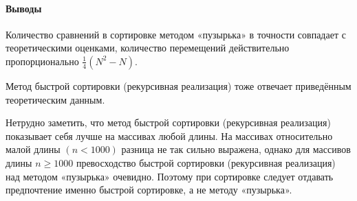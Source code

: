 \documentclass[a4paper,12pt,titlepage,final]{article}
\begin{document}
\paragraph{\vspace{0.2cm} \large Выводы\\}
Количество сравнений в сортировке методом «пузырька» в точности совпадает с теоретическими оценками, количество перемещений действительно пропорционально $\frac{1}{4}(N^2 - N)$.

Метод быстрой сортировки (рекурсивная реализация) тоже отвечает приведённым теоретическим данным.

Нетрудно заметить, что метод быстрой сортировки (рекурсивная реализация) показывает себя лучше на массивах любой длины. На массивах относительно малой длины $(n < 1000)$ разница не так сильно выражена, однако для массивов длины $n \geq 1000$ превосходство быстрой сортировки (рекурсивная реализация) над методом «пузырька» очевидно. Поэтому при сортировке следует отдавать предпочтение именно быстрой сортировке, а не методу «пузырька».

\newpage
\end{document}
